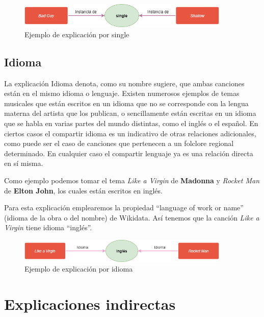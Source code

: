 \begin{figure}[h!]
	\centering
	\includegraphics[width = 0.9\textwidth]{Imagenes/Bitmap/Single ejemplo.png}
	\caption{Ejemplo de explicación por single}
	\label{fig:sampleImage}
\end{figure}

\subsection*{Idioma}

La explicación Idioma denota, como su nombre sugiere, que ambas canciones están en el mismo idioma o lenguaje. Existen numerosos ejemplos de temas musicales que están escritos en un idioma que no se corresponde con la lengua materna del artista que los publican, o sencillamente están escritas en un idioma que se habla en varias partes del mundo distintas, como el inglés o el español. En ciertos casos el compartir idioma es un indicativo de otras relaciones adicionales, como puede ser el caso de canciones que pertenecen a un folclore regional determinado. En cualquier caso el compartir lenguaje ya es una relación directa en sí misma.

Como ejemplo podemos tomar el tema \textit{Like a Virgin} de \textbf{Madonna} y \textit{Rocket Man} de \textbf{Elton John}, los cuales están escritos en inglés.

Para esta explicación emplearemos la propiedad ``language of work or name'' (idioma de la obra o del nombre) de Wikidata. Así tenemos que la canción \textit{Like a Virgin} tiene idioma ``inglés''.\\

\begin{figure}[h!]
	\centering
	\includegraphics[width = 0.9\textwidth]{Imagenes/Bitmap/Idioma ejemplo.png}
	\caption{Ejemplo de explicación por idioma}
	\label{fig:sampleImage}
\end{figure}


\section{Explicaciones indirectas}

